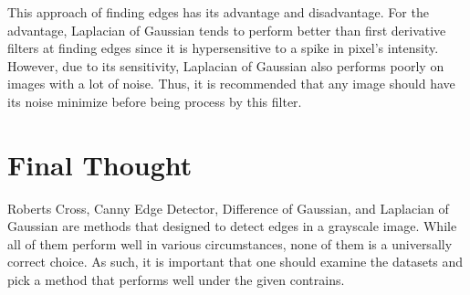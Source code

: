 \documentclass[conference]{IEEEtran}
\begin{document}
This approach of finding edges has its advantage and disadvantage. For the advantage, Laplacian of Gaussian tends to perform better than first derivative filters at finding edges since it is hypersensitive to a spike in pixel's intensity. However, due to its sensitivity, Laplacian of Gaussian also performs poorly on images with a lot of noise. Thus, it is recommended that any image should have its noise minimize before being process by this filter.

\section{Final Thought}
Roberts Cross, Canny Edge Detector, Difference of Gaussian, and Laplacian of Gaussian are methods that designed to detect edges in a grayscale image. While all of them perform well in various circumstances, none of them is a universally correct choice. As such, it is important that one should examine the datasets and pick a method that performs well under the given contrains.

\printbibliography
\end{document}
